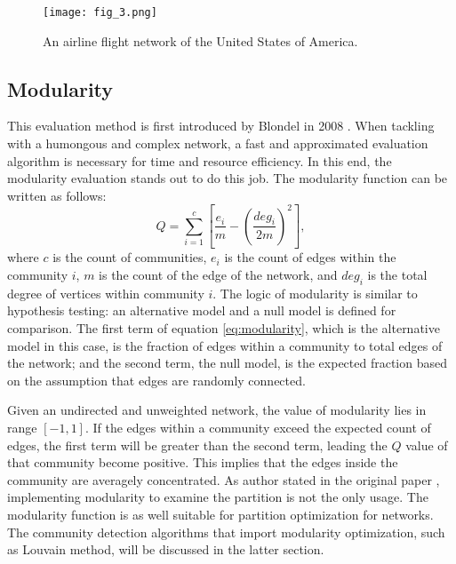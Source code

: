 \documentclass[12pt]{article}
\begin{document}
\begin{figure}
\centering
\texttt{[image: fig\_3.png]}

\caption{\label{fig:fig_3}An airline flight network of the United States of America\cite{11}.}
\end{figure}

\subsection{Modularity}

This evaluation method is first introduced by Blondel in 2008 \cite{12}. When tackling with a humongous and complex network, a fast and approximated evaluation algorithm is necessary for time and resource efficiency. In this end, the modularity evaluation stands out to do this job. The modularity function \cite{13} can be written as follows:
\begin{equation}\label{eq:modularity}
Q = \sum_{i=1}^c \left[  \frac{e_i}{m} - \left( \frac{deg_i}{2m} \right)^2  \right],
\end{equation}
where $c$ is the count of communities, $e_i$ is the count of edges within the community $i$, $m$ is the count of the edge of the network, and $deg_i$ is the total degree of vertices within community $i$. The logic of modularity is similar to hypothesis testing: an alternative model and a null model is defined for comparison. The first term of equation \eqref{eq:modularity}, which is the alternative model in this case, is the fraction of edges within a community to total edges of the network; and the second term, the null model, is the expected fraction based on the assumption that edges are randomly connected.

\bigbreak

Given an undirected and unweighted network, the value of modularity lies in range $[-1, 1]$. If the edges within a community exceed the expected count of edges, the first term will be greater than the second term, leading the $Q$ value of that community become positive. This implies that the edges inside the community are averagely concentrated. As author stated in the original paper \cite{12}, implementing modularity to examine the partition is not the only usage. The modularity function is as well suitable for partition optimization for  networks. The community detection algorithms that import modularity optimization, such as Louvain method, will be discussed in the latter section.

\bigbreak
\end{document}
